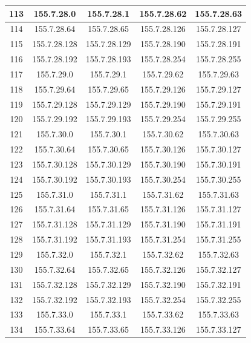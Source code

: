 \documentclass[letterpaper,12pt]{article}
\begin{document}
\begin{longtable}{|c|c|c|c|c|}
        113 & 155.7.28.0 & 155.7.28.1 & 155.7.28.62 & 155.7.28.63 \\ \hline
        114 & 155.7.28.64 & 155.7.28.65 & 155.7.28.126 & 155.7.28.127 \\ \hline
        115 & 155.7.28.128 & 155.7.28.129 & 155.7.28.190 & 155.7.28.191 \\ \hline
        116 & 155.7.28.192 & 155.7.28.193 & 155.7.28.254 & 155.7.28.255 \\ \hline
        117 & 155.7.29.0 & 155.7.29.1 & 155.7.29.62 & 155.7.29.63 \\ \hline
        118 & 155.7.29.64 & 155.7.29.65 & 155.7.29.126 & 155.7.29.127 \\ \hline
        119 & 155.7.29.128 & 155.7.29.129 & 155.7.29.190 & 155.7.29.191 \\ \hline
        120 & 155.7.29.192 & 155.7.29.193 & 155.7.29.254 & 155.7.29.255 \\ \hline
        121 & 155.7.30.0 & 155.7.30.1 & 155.7.30.62 & 155.7.30.63 \\ \hline
        122 & 155.7.30.64 & 155.7.30.65 & 155.7.30.126 & 155.7.30.127 \\ \hline
        123 & 155.7.30.128 & 155.7.30.129 & 155.7.30.190 & 155.7.30.191 \\ \hline
        124 & 155.7.30.192 & 155.7.30.193 & 155.7.30.254 & 155.7.30.255 \\ \hline
        125 & 155.7.31.0 & 155.7.31.1 & 155.7.31.62 & 155.7.31.63 \\ \hline
        126 & 155.7.31.64 & 155.7.31.65 & 155.7.31.126 & 155.7.31.127 \\ \hline
        127 & 155.7.31.128 & 155.7.31.129 & 155.7.31.190 & 155.7.31.191 \\ \hline
        128 & 155.7.31.192 & 155.7.31.193 & 155.7.31.254 & 155.7.31.255 \\ \hline
        129 & 155.7.32.0 & 155.7.32.1 & 155.7.32.62 & 155.7.32.63 \\ \hline
        130 & 155.7.32.64 & 155.7.32.65 & 155.7.32.126 & 155.7.32.127 \\ \hline
        131 & 155.7.32.128 & 155.7.32.129 & 155.7.32.190 & 155.7.32.191 \\ \hline
        132 & 155.7.32.192 & 155.7.32.193 & 155.7.32.254 & 155.7.32.255 \\ \hline
        133 & 155.7.33.0 & 155.7.33.1 & 155.7.33.62 & 155.7.33.63 \\ \hline
        134 & 155.7.33.64 & 155.7.33.65 & 155.7.33.126 & 155.7.33.127 \\ \hline

\end{longtable}
\end{document}
